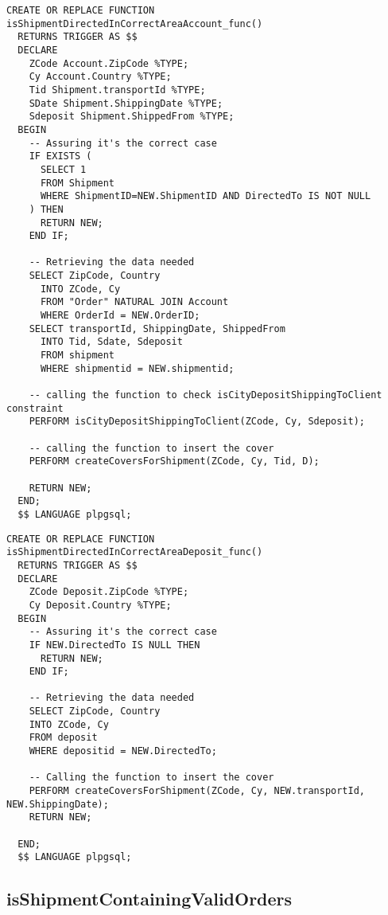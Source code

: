 \begin{lstlisting}[caption={Funzione per le spedizioni verso clienti}]
  CREATE OR REPLACE FUNCTION isShipmentDirectedInCorrectAreaAccount_func() 
  RETURNS TRIGGER AS $$
  DECLARE 
    ZCode Account.ZipCode %TYPE;
    Cy Account.Country %TYPE;
    Tid Shipment.transportId %TYPE;
    SDate Shipment.ShippingDate %TYPE;
    Sdeposit Shipment.ShippedFrom %TYPE;
  BEGIN 
    -- Assuring it's the correct case
    IF EXISTS (
      SELECT 1
      FROM Shipment
      WHERE ShipmentID=NEW.ShipmentID AND DirectedTo IS NOT NULL
    ) THEN
      RETURN NEW;
    END IF;
  
    -- Retrieving the data needed
    SELECT ZipCode, Country 
      INTO ZCode, Cy
      FROM "Order" NATURAL JOIN Account
      WHERE OrderId = NEW.OrderID;
    SELECT transportId, ShippingDate, ShippedFrom
      INTO Tid, Sdate, Sdeposit
      FROM shipment
      WHERE shipmentid = NEW.shipmentid;
        
    -- calling the function to check isCityDepositShippingToClient constraint
    PERFORM isCityDepositShippingToClient(ZCode, Cy, Sdeposit);

    -- calling the function to insert the cover
    PERFORM createCoversForShipment(ZCode, Cy, Tid, D);

    RETURN NEW;
  END;
  $$ LANGUAGE plpgsql;
\end{lstlisting}

\newpage
\begin{lstlisting}[caption={Funzione per le spedizioni verso depositi}]
  CREATE OR REPLACE FUNCTION isShipmentDirectedInCorrectAreaDeposit_func() 
  RETURNS TRIGGER AS $$
  DECLARE 
    ZCode Deposit.ZipCode %TYPE;
    Cy Deposit.Country %TYPE;
  BEGIN 
    -- Assuring it's the correct case
    IF NEW.DirectedTo IS NULL THEN 
      RETURN NEW;
    END IF;

    -- Retrieving the data needed
    SELECT ZipCode, Country 
    INTO ZCode, Cy
    FROM deposit
    WHERE depositid = NEW.DirectedTo;

    -- Calling the function to insert the cover
    PERFORM createCoversForShipment(ZCode, Cy, NEW.transportId, NEW.ShippingDate);
    RETURN NEW;

  END;
  $$ LANGUAGE plpgsql;
\end{lstlisting}


\subsection{\textbf{isShipmentContainingValidOrders}}

